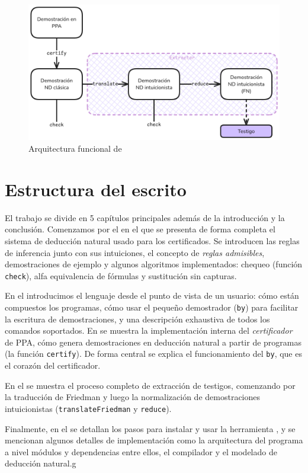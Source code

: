 \begin{figure}[h]
    \includegraphics[scale=0.42]{img/arch.png}
    \centering
    \caption{Arquitectura funcional de \ppaTool{}}
    \label{intro:fig:ppa-arch}
\end{figure}

\section{Estructura del escrito}

El trabajo se divide en 5 capítulos principales además de la introducción y la conclusión. Comenzamos por el  en el que se presenta de forma completa el sistema de deducción natural usado para los certificados. Se introducen las reglas de inferencia junto con sus intuiciones, el concepto de \textit{reglas admisibles}, demostraciones de ejemplo y algunos algoritmos implementados: chequeo (función \texttt{check}), alfa equivalencia de fórmulas y sustitución sin capturas.

En el  introducimos el lenguaje desde el punto de vista de un usuario: cómo están compuestos los programas, cómo usar el pequeño demostrador (\lstinline{by}) para facilitar la escritura de demostraciones, y una descripción exhaustiva de todos los comandos soportados. En  se muestra la implementación interna del \textit{certificador} de PPA, cómo genera demostraciones en deducción natural a partir de programas (la función \texttt{certify}). De forma central se explica el funcionamiento del \lstinline{by}, que es el corazón del certificador.

En el  se muestra el proceso completo de extracción de testigos, comenzando por la traducción de Friedman y luego la normalización de demostraciones intuicionistas (\texttt{translateFriedman} y \texttt{reduce}).

Finalmente, en el  se detallan los pasos para instalar y usar la herramienta \ppaTool{}, y se mencionan algunos detalles de implementación como la arquitectura del programa a nivel módulos y dependencias entre ellos, el compilador y el modelado de deducción natural.g